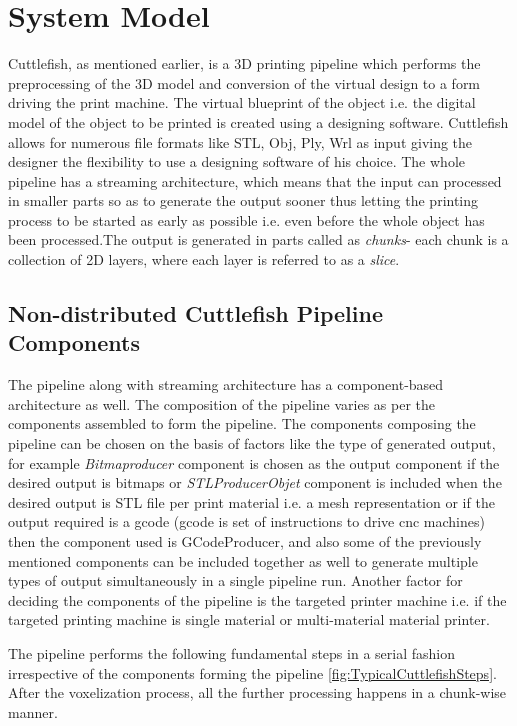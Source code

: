 \chapter{System Model}
Cuttlefish, as mentioned earlier, is a 3D printing pipeline which performs the preprocessing of the 3D model and conversion of the virtual design to a form driving the print machine. The virtual blueprint of the object i.e. the digital model of the object to be printed is created using a designing software. Cuttlefish allows for numerous file formats like STL, Obj, Ply, Wrl as input giving the designer the flexibility to use a designing software of his choice. The whole pipeline has a streaming architecture, which means that the input can processed in smaller parts so as to generate the output sooner thus letting the printing process to be started as early as possible i.e. even before the whole object has been processed.The output is generated in parts called as \textit{chunks}- each chunk is a collection of 2D layers, where each layer is referred to as a \textit{slice}. \newline

\section{Non-distributed Cuttlefish Pipeline Components}

The pipeline along with streaming architecture has a component-based architecture as well. The composition of the pipeline varies as per the components assembled to form the pipeline. The components composing the pipeline can be chosen on the basis of factors like the type of generated output, for example \textit{Bitmaproducer} component is chosen as the output component if the desired output is bitmaps or \textit{STLProducerObjet} component is included when the desired output is STL file per print material i.e. a mesh representation or if the output required is a gcode (gcode is set of instructions to drive cnc machines) then the component used is GCodeProducer, and also some of the previously mentioned components can be included together as well to generate multiple types of output simultaneously in a single pipeline run. Another factor for deciding the components of the pipeline is the targeted printer machine i.e. if the targeted printing machine is single material or multi-material material printer. 
\newline

The pipeline performs the following fundamental steps in a serial fashion irrespective of the components forming the pipeline \ref{fig:TypicalCuttlefishSteps}. After the voxelization process, all the further processing happens in a chunk-wise manner. 

